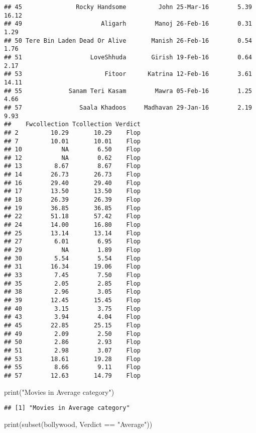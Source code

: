 \documentclass[
]{article}
\newenvironment{Shaded}{\begin{snugshade}}{\end{snugshade}}
\newcommand{\FunctionTok}[1]{\textcolor[rgb]{0.00,0.00,0.00}{#1}}
\newcommand{\NormalTok}[1]{#1}
\newcommand{\SpecialCharTok}[1]{\textcolor[rgb]{0.00,0.00,0.00}{#1}}
\newcommand{\StringTok}[1]{\textcolor[rgb]{0.31,0.60,0.02}{#1}}
\begin{document}
\begin{verbatim}
## 45               Rocky Handsome         John 25-Mar-16        5.39       16.12
## 49                      Aligarh        Manoj 26-Feb-16        0.31        1.29
## 50 Tere Bin Laden Dead Or Alive       Manish 26-Feb-16        0.54        1.76
## 51                   LoveShhuda       Girish 19-Feb-16        0.64        2.17
## 53                       Fitoor      Katrina 12-Feb-16        3.61       14.11
## 55             Sanam Teri Kasam        Mawra 05-Feb-16        1.25        4.66
## 57                Saala Khadoos     Madhavan 29-Jan-16        2.19        9.93
##    Fwcollection Tcollection Verdict
## 2         10.29       10.29    Flop
## 7         10.01       10.01    Flop
## 10           NA        6.50    Flop
## 12           NA        0.62    Flop
## 13         8.67        8.67    Flop
## 14        26.73       26.73    Flop
## 16        29.40       29.40    Flop
## 17        13.50       13.50    Flop
## 18        26.39       26.39    Flop
## 19        36.85       36.85    Flop
## 22        51.18       57.42    Flop
## 24        14.00       16.80    Flop
## 25        13.14       13.14    Flop
## 27         6.01        6.95    Flop
## 29           NA        1.89    Flop
## 30         5.54        5.54    Flop
## 31        16.34       19.06    Flop
## 33         7.45        7.50    Flop
## 35         2.05        2.85    Flop
## 38         2.96        3.05    Flop
## 39        12.45       15.45    Flop
## 40         3.15        3.75    Flop
## 43         3.94        4.04    Flop
## 45        22.85       25.15    Flop
## 49         2.09        2.50    Flop
## 50         2.86        2.93    Flop
## 51         2.98        3.07    Flop
## 53        18.61       19.28    Flop
## 55         8.66        9.11    Flop
## 57        12.63       14.79    Flop
\end{verbatim}

\begin{Shaded}
\begin{Highlighting}[]
\FunctionTok{print}\NormalTok{(}\StringTok{"Movies in Average category"}\NormalTok{)}
\end{Highlighting}
\end{Shaded}

\begin{verbatim}
## [1] "Movies in Average category"
\end{verbatim}

\begin{Shaded}
\begin{Highlighting}[]
\FunctionTok{print}\NormalTok{(}\FunctionTok{subset}\NormalTok{(bollywood, Verdict }\SpecialCharTok{==} \StringTok{"Average"}\NormalTok{))}
\end{Highlighting}
\end{Shaded}
\end{document}
